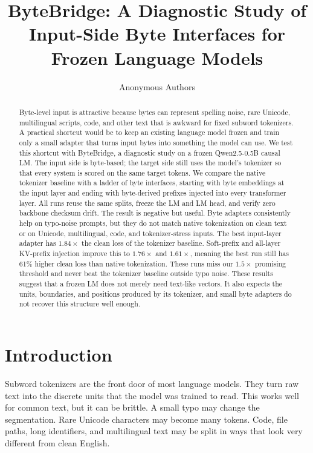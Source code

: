 \documentclass{article}
\title{ByteBridge: A Diagnostic Study of Input-Side Byte Interfaces for Frozen Language Models}
\author{Anonymous Authors}
\newcommand{\bb}{ByteBridge}
\newcommand{\qwen}{Qwen2.5-0.5B}
\begin{document}
\ifcolmsubmission
\linenumbers
\fi

\maketitle

\begin{abstract}
Byte-level input is attractive because bytes can represent spelling noise, rare Unicode, multilingual scripts, code, and other text that is awkward for fixed subword tokenizers. A practical shortcut would be to keep an existing language model frozen and train only a small adapter that turns input bytes into something the model can use. We test this shortcut with \bb, a diagnostic study on a frozen \qwen{} causal LM. The input side is byte-based; the target side still uses the model's tokenizer so that every system is scored on the same target tokens. We compare the native tokenizer baseline with a ladder of byte interfaces, starting with byte embeddings at the input layer and ending with byte-derived prefixes injected into every transformer layer. All runs reuse the same splits, freeze the LM and LM head, and verify zero backbone checksum drift. The result is negative but useful. Byte adapters consistently help on typo-noise prompts, but they do not match native tokenization on clean text or on Unicode, multilingual, code, and tokenizer-stress inputs. The best input-layer adapter has $1.84\times$ the clean loss of the tokenizer baseline. Soft-prefix and all-layer KV-prefix injection improve this to $1.76\times$ and $1.61\times$, meaning the best run still has 61\% higher clean loss than native tokenization. These runs miss our $1.5\times$ promising threshold and never beat the tokenizer baseline outside typo noise. These results suggest that a frozen LM does not merely need text-like vectors. It also expects the units, boundaries, and positions produced by its tokenizer, and small byte adapters do not recover this structure well enough.
\end{abstract}

\section{Introduction}

Subword tokenizers are the front door of most language models. They turn raw text into the discrete units that the model was trained to read. This works well for common text, but it can be brittle. A small typo may change the segmentation. Rare Unicode characters may become many tokens. Code, file paths, long identifiers, and multilingual text may be split in ways that look very different from clean English.
\end{document}
